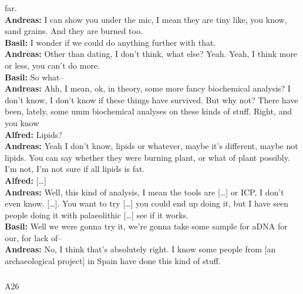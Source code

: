 \documentclass[
  canadian,
]{article}
\makeatletter
\let\oldsubparagraph\subparagraph
\renewcommand{\subparagraph}{
    \@ifstar
      \xxxSubParagraphStar
      \xxxSubParagraphNoStar
  }
\newcommand{\xxxSubParagraphStar}[1]{\oldsubparagraph*{#1}\mbox{}}
\newcommand{\xxxSubParagraphNoStar}[1]{\oldsubparagraph{#1}\mbox{}}
\makeatother
\begin{document}
far.\\
\textbf{Andreas:} I can show you under the mic, I mean they are tiny
like, you know, sand grains. And they are burned too.\\
\textbf{Basil:} I wonder if we could do anything further with that.\\
\textbf{Andreas:} Other than dating, I don't think, what else? Yeah.
Yeah, I think more or less, you can't do more.\\
\textbf{Basil:} So what--\\
\textbf{Andreas:} Ahh, I mean, ok, in theory, some more fancy
biochemical analysis? I don't know, I don't know if these things have
survived. But why not? There have been, lately, some umm biochemical
analyses on these kinds of stuff. Right, and you know\\
\textbf{Alfred:} Lipids?\\
\textbf{Andreas:} Yeah I don't know, lipids or whatever, maybe it's
different, maybe not lipids. You can say whether they were burning
plant, or what of plant possibly. I'm not, I'm not sure if all lipids is
fat.\\
\textbf{Alfred:} {[}\ldots{]}\\
\textbf{Andreas:} Well, this kind of analysis, I mean the tools are
{[}\ldots{]} or ICP, I don't even know. {[}\ldots{]}. You want to try
{[}\ldots{]} you could end up doing it, but I have seen people doing it
with palaeolithic {[}\ldots{]} see if it works.\\
\textbf{Basil:} Well we were gonna try it, we're gonna take some sample
for aDNA for our, for lack of--\\
\textbf{Andreas:} No, I think that's absolutely right. I know some
people from {[}an archaeological project{]} in Spain have done this kind
of stuff.

\subparagraph{A26}\label{sec-A26}
\end{document}

